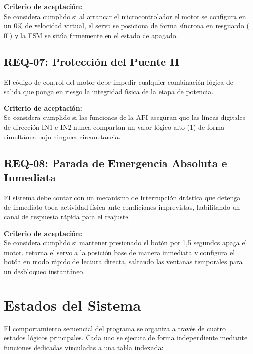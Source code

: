 \documentclass[12pt, letterpaper]{article}
\begin{document}
\noindent \textbf{Criterio de aceptación:} \\
Se considera cumplido si al arrancar el microcontrolador el motor se configura en un 0\% de velocidad virtual, el servo se posiciona de forma síncrona en resguardo ($0^\circ$) y la FSM se sitúa firmemente en el estado de apagado.

\subsection{REQ-07: Protección del Puente H}
El código de control del motor debe impedir cualquier combinación lógica de salida que ponga en riesgo la integridad física de la etapa de potencia.

\vspace{0.5cm}

\noindent \textbf{Criterio de aceptación:} \\
Se considera cumplido si las funciones de la API aseguran que las líneas digitales de dirección IN1 e IN2 nunca compartan un valor lógico alto (1) de forma simultánea bajo ninguna circunstancia.

\subsection{REQ-08: Parada de Emergencia Absoluta e Inmediata}
El sistema debe contar con un mecanismo de interrupción drástica que detenga de inmediato toda actividad física ante condiciones imprevistas, habilitando un canal de respuesta rápida para el reajuste.

\vspace{0.5cm}

\noindent \textbf{Criterio de aceptación:} \\
Se considera cumplido si mantener presionado el botón por 1,5 segundos apaga el motor, retorna el servo a la posición base de manera inmediata y configura el botón en modo rápido de lectura directa, saltando las ventanas temporales para un desbloqueo instantáneo.

\section{Estados del Sistema}
\label{sec:estados_preliminares}

El comportamiento secuencial del programa se organiza a través de cuatro estados lógicos principales. Cada uno se ejecuta de forma independiente mediante funciones dedicadas vinculadas a una tabla indexada:
\end{document}
